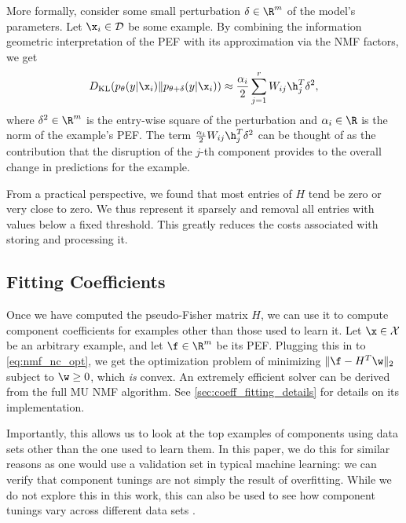 \documentclass[dvipsnames]{article}
\begin{document}
More formally, consider some small perturbation $\delta \in \R^m$ of the model's parameters.
Let $\x_i \in \mathcal D$ be some example.
By combining the information geometric interpretation of the PEF with its approximation via the NMF factors, we get
\begin{equation}\label{eq:pef_nmf_info_geom}
D_\mathrm{KL}(p_\theta(y|\x_i) \| p_{\theta+\delta}(y|\x_i)) \approx \frac{\alpha_i}2 \sum_{j=1}^r W_{ij}\h_j^T \delta^2,
\end{equation}
where $\delta^2 \in \R^m$ is the entry-wise square of the perturbation and $\alpha_i \in \R$ is the norm of the example's PEF.
The term $\frac{\alpha_i}2 W_{ij}\h_j^T \delta^2$ can be thought of as the contribution that the disruption of the $j$-th component provides to the overall change in predictions for the example.

From a practical perspective, we found that most entries of $H$ tend be zero or very close to zero.
We thus represent it sparsely and removal all entries with values below a fixed threshold.
This greatly reduces the costs associated with storing and processing it.

\subsection{Fitting Coefficients}\label{sec:fitting_coeffs}
Once we have computed the pseudo-Fisher matrix $H$, we can use it to compute component coefficients for examples other than those used to learn it.
Let $\x\in\mathcal X$ be an arbitrary example, and let $\f\in\R^m$ be its PEF.
Plugging this in to \eqref{eq:nmf_nc_opt}, we get the optimization problem of minimizing $\|\f - H^T\w\|_2$ subject to $ \w \geq 0$,
which \textit{is} convex.
An extremely efficient solver can be derived from the full MU NMF algorithm.
See \cref{sec:coeff_fitting_details} for details on its implementation.

Importantly, this allows us to look at the top examples of components using data sets other than the one used to learn them.
In this paper, we do this for similar reasons as one would use a validation set in typical machine learning: we can verify that component tunings are not simply the result of overfitting.
While we do not explore this in this work, this can also be used to see how component tunings vary across different data sets \citep{bolukbasi2021interpretability}.
\end{document}
